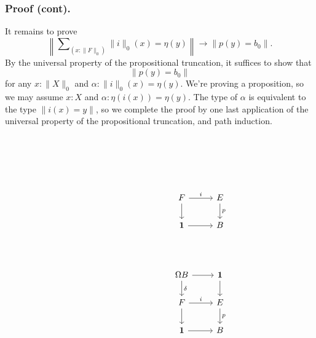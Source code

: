 \documentclass[handout]{beamer}
\newcommand{\brck}[1]{\|#1\|}
\newcommand{\trunc}[2]{\|#2\|_{#1}}
\newcommand{\unit}{\mathbf{1}}
\begin{document}
\begin{frame}
  \frametitle{Proof (cont).}
  It remains to prove
  \begin{equation*}
    \left\|\sum\nolimits_{(x:\trunc{0}{F})}\trunc{0}{i}(x)=\eta(y)\right\|\to \brck{p(y)=b_0}.
    \end{equation*}
  By the universal property of the propositional truncation, it suffices to show that
    \begin{equation*}
      \brck{p(y)=b_0}
    \end{equation*}
    for any $x:\trunc{0}{X}$ and $\alpha:\trunc{0}{i}(x)=\eta(y)$. We're proving a proposition, so we may assume $x:X$ and $\alpha:\eta(i(x))=\eta(y)$. The type of $\alpha$ is equivalent to the type $\brck{i(x)=y}$, so we complete the proof by one last application of the universal property of the propositional truncation, and path induction.
\end{frame}

\begin{frame}
  \begin{equation*}
    \begin{tikzcd}[ampersand replacement=\&]
      \phantom{\cdots} \arrow[r,phantom,"\phantom{\Omega\delta}"] \& \phantom{\Omega F} \arrow[r,phantom] \arrow[d,phantom,"\phantom{\Omega i}"] \& \phantom{\unit} \arrow[d,phantom] \\
      \phantom{\cdots} \arrow[r,phantom] \& \phantom{\Omega E} \arrow[r,phantom,"\phantom{\Omega p}"] \arrow[d,phantom] \& \phantom{\Omega B} \arrow[d,phantom,"\phantom{\delta}"] \arrow[r,phantom] \& \phantom{\unit} \arrow[d,phantom] \\
      \& \phantom{\unit} \arrow[r,phantom] \& F \arrow[r,"i"] \arrow[d] \& E \arrow[d,"p"] \\
      \& \& \unit \arrow[r] \& B
    \end{tikzcd}
  \end{equation*}
\end{frame}

\begin{frame}
  \begin{equation*}
    \begin{tikzcd}[ampersand replacement=\&]
      \phantom{\cdots} \arrow[r,phantom,"\phantom{\Omega\delta}"] \& \phantom{\Omega F} \arrow[r,phantom] \arrow[d,phantom,"\phantom{\Omega i}"] \& \phantom{\unit} \arrow[d,phantom] \\
      \phantom{\cdots} \arrow[r,phantom] \& \phantom{\Omega E} \arrow[r,phantom,"\phantom{\Omega p}"] \arrow[d,phantom] \& \Omega B \arrow[d,"\delta"] \arrow[r] \& \unit \arrow[d] \\
      \& \phantom{\unit} \arrow[r,phantom] \& F \arrow[r,"i"] \arrow[d] \& E \arrow[d,"p"] \\
      \& \& \unit \arrow[r] \& B
    \end{tikzcd}
  \end{equation*}
\end{frame}
\end{document}

